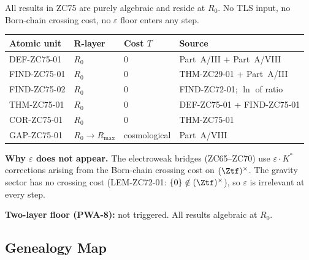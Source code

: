 \documentclass[12pt, a4paper]{article}
\begin{document}
\begin{layerbox}[title={R-Layer Assignments for ZC75}]

All results in ZC75 are purely algebraic and reside at $R_0$.
No TLS input, no Born-chain crossing cost, no $\varepsilon$ floor
enters any step.

\medskip
{\small\renewcommand{\arraystretch}{1.25}
\begin{center}
\begin{tabular}{@{}llll@{}}
\toprule
Atomic unit & R-layer & Cost $T$ & Source \\
\midrule
DEF-ZC75-01 & $R_0$ & $0$ & Part~A/III + Part~A/VIII \\
FIND-ZC75-01 & $R_0$ & $0$ & THM-ZC29-01 + Part~A/III \\
FIND-ZC75-02 & $R_0$ & $0$ & FIND-ZC72-01; $\ln$ of ratio \\
THM-ZC75-01  & $R_0$ & $0$ & DEF-ZC75-01 + FIND-ZC75-01 \\
COR-ZC75-01  & $R_0$ & $0$ & THM-ZC75-01 \\
GAP-ZC75-01  & $R_0 \to R_{\max}$ & cosmological & Part~A/VIII \\
\bottomrule
\end{tabular}
\end{center}}

\textbf{Why $\varepsilon$ does not appear.}
The electroweak bridges (ZC65--ZC70) use $\varepsilon \cdot K^*$
corrections arising from the Born-chain crossing cost on
$(\Ztf)^\times$.
The gravity sector has no crossing cost (LEM-ZC72-01: $\{0\} \notin
(\Ztf)^\times$), so $\varepsilon$ is irrelevant at every step.

\textbf{Two-layer floor (PWA-8):} not triggered.
All results algebraic at $R_0$.
\end{layerbox}

\subsection{Genealogy Map}
\label{sec:genealogy}
\end{document}
